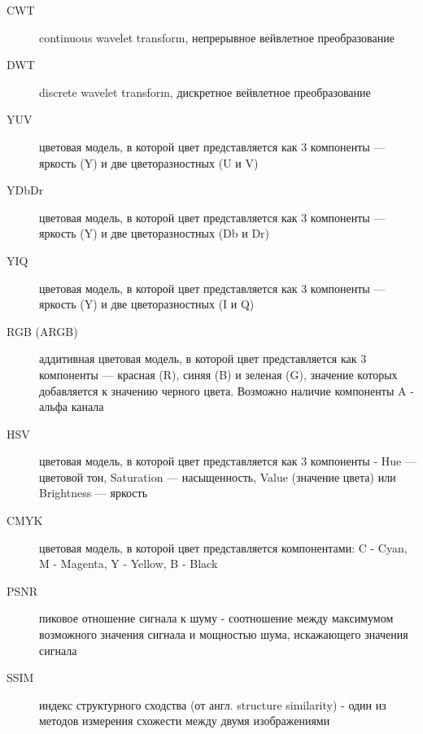 \Abbreviations %
\begin{description}
\item[CWT] continuous wavelet transform, непрерывное вейвлетное преобразование
\end{description}
\begin{description}
\item[DWT] discrete wavelet transform, дискретное вейвлетное преобразование
\end{description}
\begin{description}
\item[YUV] цветовая модель, в которой цвет представляется как 3 компоненты — яркость (Y) и две цветоразностных (U и V)
\end{description}

\begin{description}
\item[YDbDr] цветовая модель, в которой цвет представляется как 3 компоненты — яркость (Y) и две цветоразностных (Db и Dr)
\end{description}

\begin{description}
\item[YIQ] цветовая модель, в которой цвет представляется как 3 компоненты — яркость (Y) и две цветоразностных (I и Q)
\end{description}

\begin{description}
\item[RGB (ARGB)] аддитивная цветовая модель, в которой цвет представляется как 3 компоненты — красная (R), синяя (B) и зеленая (G), 
значение которых добавляется к значению черного цвета. Возможно наличие компоненты A - альфа канала
\end{description}

\begin{description}
\item[HSV] цветовая модель, в которой цвет представляется как 3 компоненты - Hue — цветовой тон, 
Saturation — насыщенность, Value (значение цвета) или Brightness — яркость
\end{description}

\begin{description}
\item[CMYK] цветовая модель, в которой цвет представляется компонентами: C - Cyan, M - Magenta, Y - Yellow, B - Black
\end{description}

\begin{description}
\item[PSNR] пиковое отношение сигнала к шуму - соотношение между максимумом возможного значения сигнала и мощностью шума, искажающего значения сигнала
\end{description}

\begin{description}
\item[SSIM] индекс структурного сходства (от англ. structure similarity) - один из методов измерения схожести между двумя изображениями
\end{description}



